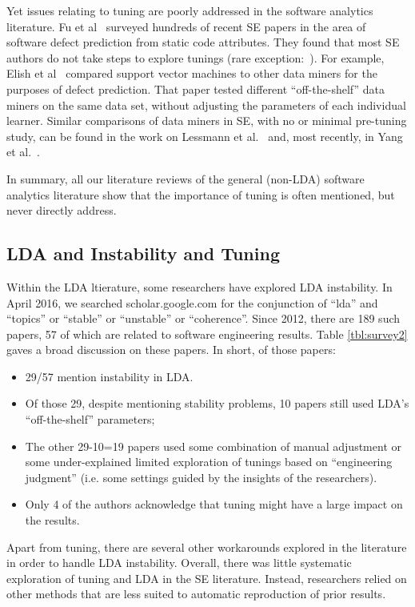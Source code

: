 \documentclass[twocolumn,5p,sort&compress]{elsarticle}
\newcommand{\bi}{\begin{itemize}}
\newcommand{\ei}{\end{itemize}}
\theoremstyle{break}
\begin{document}
Yet issues relating to
tuning are poorly addressed in the software analytics literature.  Fu et al~\cite{fu2016tuning} surveyed hundreds of recent SE papers in the area
of software defect prediction from static code attributes. They found that most SE
  authors do not take steps to explore tunings (rare exception:~\cite{tantithamthavorn2016icse}). For example, Elish et
  al~\cite{elish2008predicting} compared support vector machines to other data
  miners for the purposes of defect prediction. That paper tested different
  ``off-the-shelf'' data miners on the same data set, without adjusting the
  parameters of each individual learner. Similar comparisons of data miners in SE,
with no or minimal pre-tuning study, can be found in the work on Lessmann et al.~\cite{4527256}
and, most recently, in Yang et al.~\cite{Yang:2016}.  

In summary, all our literature reviews of the general  (non-LDA) software analytics literature
show that
the importance of tuning is often mentioned, but never directly address.

\subsection{LDA and  Instability and Tuning}
\label{sect:solutions}
Within the LDA ltierature, some researchers
have explored LDA instability.
In April 2016, we searched scholar.google.com for the conjunction of ``lda'' and ``topics'' or ``stable'' or
``unstable'' or ``coherence''. Since 2012, there are  189 such papers, 57
of which are related to software engineering results. Table \ref{tbl:survey2} gaves a broad discussion on these papers. In short, of those papers:
\bi
\item 29/57
mention instability in LDA. %
\item Of those 29, despite mentioning stability problems,
  10 papers still used LDA's ``off-the-shelf'' parameters;
  \item The  other 29-10=19 papers used some combination of manual adjustment or some
under-explained limited exploration of tunings based on ``engineering judgment''
(i.e. some settings guided by the insights of the researchers).
\item
Only 4 of the authors acknowledge that tuning might have a large impact
on the results.
\ei
Apart from tuning, there are several other workarounds explored in the literature
in order to handle LDA instability. Overall, there was little systematic exploration of tuning and LDA in the SE literature.
Instead, researchers relied on other methods that are less suited to automatic reproduction of prior results.
\end{document}
